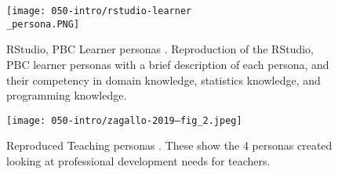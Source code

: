 \documentclass[010-intro.tex]{subfiles}
\begin{document}
    \begin{figure}[!hbtp]
        \centering
        \texttt{[image: 050-intro/rstudio-learner\\\_persona.PNG]}
        \caption[RStudio, PBC Learner Personas]{
        RStudio, PBC Learner personas \cite{rstudioLearnerPersonas2019}.
        Reproduction of the RStudio, PBC learner personas with a brief description of each persona,
        and their competency in domain knowledge, statistics knowledge, and programming knowledge.}
        \label{fig:rstudio-learner-personas}
    \end{figure}

    \begin{figure}[!hbtp]
        \centering
        \texttt{[image: 050-intro/zagallo-2019--fig\_2.jpeg]}
        \caption[Reproduced Teaching Personas \cite{zagallo2019through}]{
        Reproduced Teaching personas \cite{zagallo2019through}.
        These show the 4 personas created looking at professional development needs for teachers.
        }
        \label{fig:teaching-personas}
    \end{figure}
\end{document}

